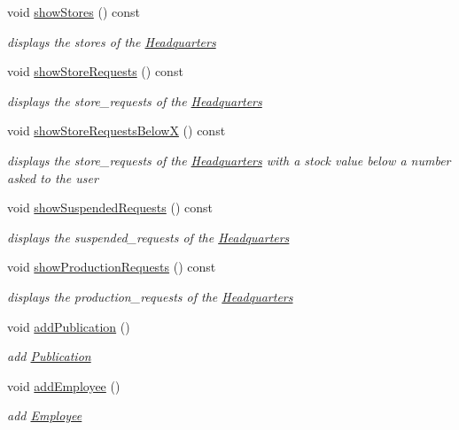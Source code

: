 \begin{DoxyCompactItemize}
void \hyperlink{class_headquarters_a5bd547ce60d0ebf56fa578686f88d207}{show\+Stores} () const
\begin{DoxyCompactList}\small\item\em displays the stores of the \hyperlink{class_headquarters}{Headquarters} \end{DoxyCompactList}\item 
void \hyperlink{class_headquarters_a57d34b620b22f134ffc64be46b830424}{show\+Store\+Requests} () const
\begin{DoxyCompactList}\small\item\em displays the store\+\_\+requests of the \hyperlink{class_headquarters}{Headquarters} \end{DoxyCompactList}\item 
void \hyperlink{class_headquarters_ae1260f49cce6c42face483c597ba1478}{show\+Store\+Requests\+BelowX} () const
\begin{DoxyCompactList}\small\item\em displays the store\+\_\+requests of the \hyperlink{class_headquarters}{Headquarters} with a stock value below a number asked to the user \end{DoxyCompactList}\item 
void \hyperlink{class_headquarters_af5180e48a82aaa4b2f0c74428aeaa589}{show\+Suspended\+Requests} () const
\begin{DoxyCompactList}\small\item\em displays the suspended\+\_\+requests of the \hyperlink{class_headquarters}{Headquarters} \end{DoxyCompactList}\item 
void \hyperlink{class_headquarters_af1bdf66c16fe6b211fffe03a81a69ec2}{show\+Production\+Requests} () const
\begin{DoxyCompactList}\small\item\em displays the production\+\_\+requests of the \hyperlink{class_headquarters}{Headquarters} \end{DoxyCompactList}\item 
void \hyperlink{class_headquarters_ad232157623c9d2ada742982f08a82be8}{add\+Publication} ()
\begin{DoxyCompactList}\small\item\em add \hyperlink{class_publication}{Publication} \end{DoxyCompactList}\item 
void \hyperlink{class_headquarters_ac99ce9ba98b3bdddef13fedd5d2528f0}{add\+Employee} ()
\begin{DoxyCompactList}\small\item\em add \hyperlink{class_employee}{Employee} \end{DoxyCompactList}\item 

\end{DoxyCompactItemize}
